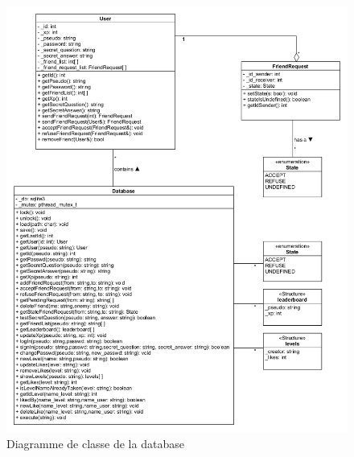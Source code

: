 \documentclass[french]{article}
\begin{document}
\begin{figure}[!htbp]
    \centering
    \includegraphics[scale=0.5]{class_diagram/class_diagram_database.png}
    \caption{Diagramme de classe de la database} %
    \label{diagram class:connection menu}
\end{figure}
\newpage
\end{document}
